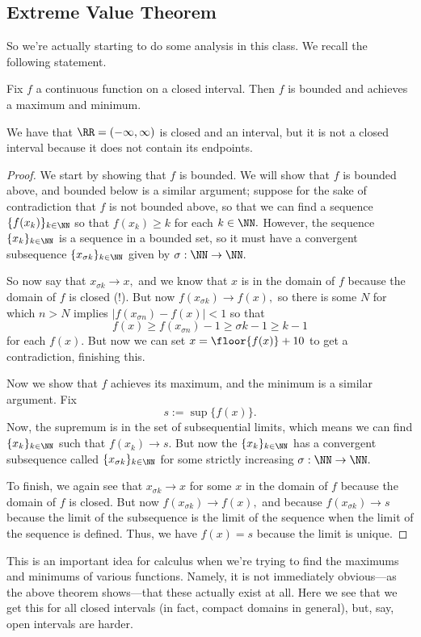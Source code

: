 \subsection{Extreme Value Theorem}
So we're actually starting to do some analysis in this class. We recall the following statement.
\begin{theorem}
	Fix $f$ a continuous function on a closed interval. Then $f$ is bounded and achieves a maximum and minimum.
\end{theorem}
\begin{warn}
	We have that $\RR=(-\infty,\infty)$ is closed and an interval, but it is not a closed interval because it does not contain its endpoints.
\end{warn}
\begin{proof}
	We start by showing that $f$ is bounded. We will show that $f$ is bounded above, and bounded below is a similar argument; suppose for the sake of contradiction that $f$ is not bounded above, so that we can find a sequence $\{f(x_k)\}_{k\in\NN}$ so that $f(x_k)\ge k$ for each $k\in\NN.$ However, the sequence $\{x_k\}_{k\in\NN}$ is a sequence in a bounded set, so it must have a convergent subsequence $\{x_{\sigma k}\}_{k\in\NN}$ given by $\sigma:\NN\to\NN.$

	So now say that $x_{\sigma k}\to x,$ and we know that $x$ is in the domain of $f$ because the domain of $f$ is closed (!). But now $f(x_{\sigma k})\to f(x),$ so there is some $N$ for which $n>N$ implies $|f(x_{\sigma n})-f(x)|<1$ so that
	\[f(x)\ge f(x_{\sigma n})-1\ge\sigma k-1\ge k-1\]
	for each $f(x).$ But now we can set $x=\floor{f(x)}+10$ to get a contradiction, finishing this.

	Now we show that $f$ achieves its maximum, and the minimum is a similar argument. Fix
	\[s:=\sup\{f(x)\}.\]
	Now, the supremum is in the set of subsequential limits, which means we can find $\{x_k\}_{k\in\NN}$ such that $f(x_k)\to s.$ But now the $\{x_k\}_{k\in\NN}$ has a convergent subsequence called $\{x_{\sigma k}\}_{k\in\NN}$ for some strictly increasing $\sigma:\NN\to\NN.$

	To finish, we again see that $x_{\sigma k}\to x$ for some $x$ in the domain of $f$ because the domain of $f$ is closed. But now $f(x_{\sigma k})\to f(x),$ and because $f(x_{\sigma k})\to s$ because the limit of the subsequence is the limit of the sequence when the limit of the sequence is defined. Thus, we have $f(x)=s$ because the limit is unique.
\end{proof}
This is an important idea for calculus when we're trying to find the maximums and minimums of various functions. Namely, it is not immediately obvious---as the above theorem shows---that these actually exist at all. Here we see that we get this for all closed intervals (in fact, compact domains in general), but, say, open intervals are harder.
